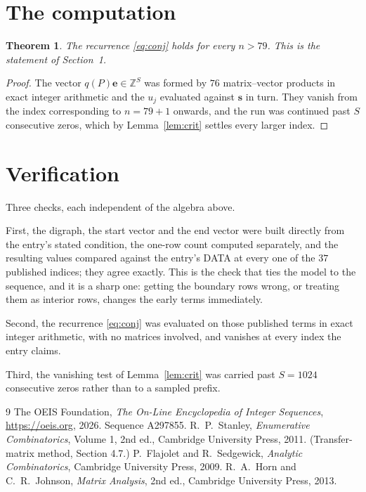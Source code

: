\documentclass[11pt,a4paper]{article}
\theoremstyle{plain}
\newtheorem{theorem}{Theorem}
\theoremstyle{definition}
\begin{document}
\section{The computation}

\begin{theorem}
The recurrence \eqref{eq:conj} holds for every $n>79$. This is the statement of
Section~1.
\end{theorem}

\begin{proof}
The vector $q(P)\mathbf{e}\in\mathbb{Z}^{S}$ was formed by $76$ matrix--vector
products in exact integer arithmetic and the $u_j$ evaluated against $\mathbf{s}$ in turn.
They vanish from the index corresponding to $n=79+1$ onwards, and the run was continued
past $S$ consecutive zeros, which by Lemma~\ref{lem:crit} settles every larger index.
\end{proof}

\section{Verification}

Three checks, each independent of the algebra above.

First, the digraph, the start vector and the end vector were built directly from the
entry's stated condition, the one-row count computed separately, and the resulting values
compared against the entry's DATA at every one of the $37$ published indices; they
agree exactly. This is the check that ties the model to the sequence, and it is a sharp one:
getting the boundary rows wrong, or treating them as interior rows, changes the early terms
immediately.

Second, the recurrence \eqref{eq:conj} was evaluated on those published terms in exact
integer arithmetic, with no matrices involved, and vanishes at every index the entry claims.

Third, the vanishing test of Lemma~\ref{lem:crit} was carried past $S=1024$ consecutive
zeros rather than to a sampled prefix.

\begin{thebibliography}{9}
 The OEIS Foundation, \emph{The On-Line Encyclopedia of Integer
Sequences}, \url{https://oeis.org}, 2026. Sequence A297855.
 R.~P.~Stanley, \emph{Enumerative Combinatorics}, Volume 1, 2nd ed.,
Cambridge University Press, 2011. (Transfer-matrix method, Section 4.7.)
 P.~Flajolet and R.~Sedgewick, \emph{Analytic Combinatorics}, Cambridge
University Press, 2009.
 R.~A.~Horn and C.~R.~Johnson, \emph{Matrix Analysis}, 2nd ed., Cambridge
University Press, 2013.
\end{thebibliography}
\end{document}
